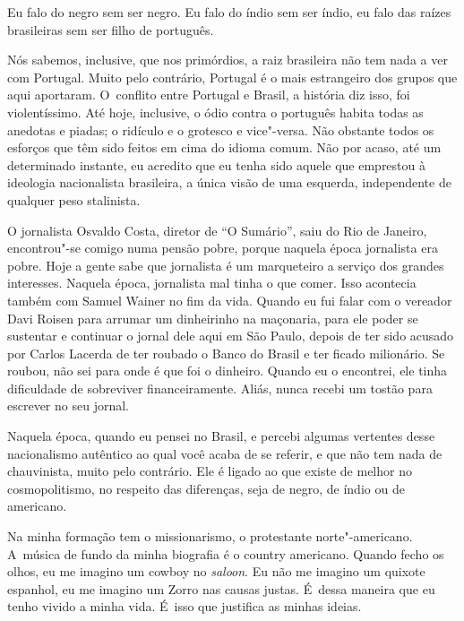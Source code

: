 Eu falo do negro sem ser negro. Eu falo do índio sem ser índio, eu falo
das raízes brasileiras sem ser filho de português.

 

Nós sabemos, inclusive, que nos primórdios, a raiz brasileira não tem
nada a ver com Portugal. Muito pelo contrário, Portugal é o mais
estrangeiro dos grupos que aqui aportaram. O~conflito entre Portugal e
Brasil, a história diz isso, foi violentíssimo. Até hoje, inclusive, o
ódio contra o português habita todas as anedotas e piadas; o ridículo e
o grotesco e vice"-versa. Não obstante todos os esforços que têm sido
feitos em cima do idioma comum. Não por acaso, até um determinado
instante, eu acredito que eu tenha sido aquele que emprestou à ideologia
nacionalista brasileira, a única visão de uma esquerda, independente de
qualquer peso stalinista.

 

O jornalista Osvaldo Costa, diretor de ``O Sumário'', saiu do Rio de
Janeiro, encontrou"-se comigo numa pensão pobre, porque naquela época
jornalista era pobre. Hoje a gente sabe que jornalista é um marqueteiro
a serviço dos grandes interesses. Naquela época, jornalista mal tinha o
que comer. Isso acontecia também com Samuel Wainer no fim da vida.
Quando eu fui falar com o vereador Davi Roisen para arrumar um
dinheirinho na maçonaria, para ele poder se sustentar e continuar o
jornal dele aqui em São Paulo, depois de ter sido acusado por
Carlos Lacerda de ter roubado o Banco do Brasil e ter ficado milionário.
Se roubou, não sei para onde é que foi o dinheiro. Quando eu o
encontrei, ele tinha dificuldade de sobreviver financeiramente. Aliás,
nunca recebi um tostão para escrever no seu jornal.

 

Naquela época, quando eu pensei no Brasil, e percebi algumas vertentes
desse nacionalismo autêntico ao qual você acaba de se referir, e que não
tem nada de chauvinista, muito pelo contrário. Ele é ligado ao que
existe de melhor no cosmopolitismo, no respeito das diferenças, seja de
negro, de índio ou de americano.

 

Na minha formação tem o missionarismo, o protestante norte"-americano. A~música de fundo da minha biografia é o country americano. Quando fecho
os olhos, eu me imagino um cowboy no \emph{saloon}. Eu não me imagino um quixote
espanhol, eu me imagino um Zorro nas causas justas. É~dessa maneira que
eu tenho vivido a minha vida. É~isso que justifica as minhas ideias.

